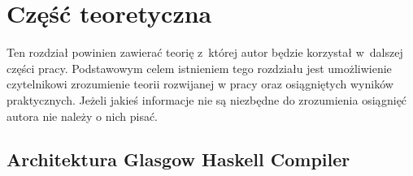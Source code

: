 \chapter{Część teoretyczna}\label{chap:teoria}
Ten rozdział powinien zawierać teorię z~której autor będzie korzystał w~dalszej
części pracy.  Podstawowym celem istnieniem tego rozdziału jest umożliwienie
czytelnikowi zrozumienie teorii rozwijanej w pracy oraz osiągniętych wyników
praktycznych.  Jeżeli jakieś informacje nie są niezbędne do zrozumienia
osiągnięć autora nie należy o nich pisać.

\section{Architektura Glasgow Haskell Compiler}


